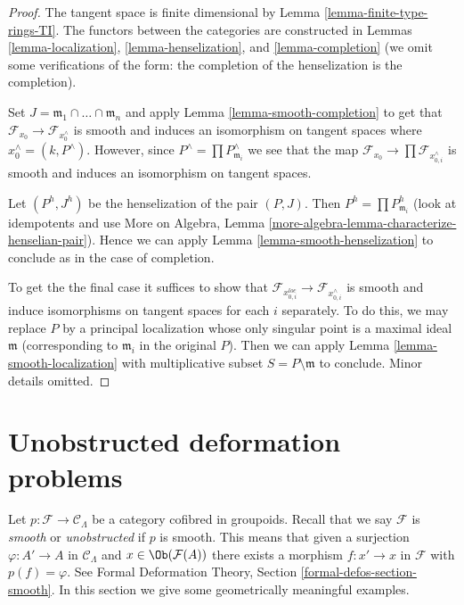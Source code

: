 \begin{proof}
The tangent space is finite dimensional by
Lemma \ref{lemma-finite-type-rings-TI}.
The functors between the categories are constructed
in Lemmas \ref{lemma-localization}, \ref{lemma-henselization}, and
\ref{lemma-completion} (we omit some verifications of the form:
the completion of the henselization is the completion).

\medskip\noindent
Set $J = \mathfrak m_1 \cap \ldots \cap \mathfrak m_n$ and apply
Lemma \ref{lemma-smooth-completion} to get that
$\mathcal{F}_{x_0} \to \mathcal{F}_{x_0^\wedge}$
is smooth and induces an isomorphism on tangent spaces
where $x_0^\wedge = (k, P^\wedge)$.
However, since $P^\wedge = \prod P_{\mathfrak m_i}^\wedge$
we see that the map
$\mathcal{F}_{x_0} \to \prod \mathcal{F}_{x_{0, i}^\wedge}$
is smooth and induces an isomorphism on tangent spaces.

\medskip\noindent
Let $(P^h, J^h)$ be the henselization of the pair $(P, J)$.
Then $P^h = \prod P_{\mathfrak m_i}^h$ (look at idempotents
and use More on Algebra, Lemma
\ref{more-algebra-lemma-characterize-henselian-pair}).
Hence we can apply Lemma \ref{lemma-smooth-henselization}
to conclude as in the case of completion.

\medskip\noindent
To get the the final case it suffices to show that
$\mathcal{F}_{x_{0, i}^{loc}} \to \mathcal{F}_{x_{0, i}^\wedge}$
is smooth and induce isomorphisms on tangent spaces for each $i$ separately.
To do this, we may replace $P$ by a principal localization
whose only singular point is a maximal ideal $\mathfrak m$
(corresponding to $\mathfrak m_i$ in the original $P$).
Then we can apply
Lemma \ref{lemma-smooth-localization}
with multiplicative subset $S = P \setminus \mathfrak m$ to conclude.
Minor details omitted.
\end{proof}






\section{Unobstructed deformation problems}
\label{section-unobstructed}

\noindent
Let $p : \mathcal{F} \to \mathcal{C}_\Lambda$ be a
category cofibred in groupoids. Recall that we say $\mathcal{F}$
is {\it smooth} or {\it unobstructed} if $p$ is smooth.
This means that given a surjection $\varphi : A' \to A$ in
$\mathcal{C}_\Lambda$ and $x \in \Ob(\mathcal{F}(A))$
there exists a morphism $f : x' \to x$ in $\mathcal{F}$
with $p(f) = \varphi$.
See Formal Deformation Theory, Section \ref{formal-defos-section-smooth}.
In this section we give some geometrically meaningful examples.


